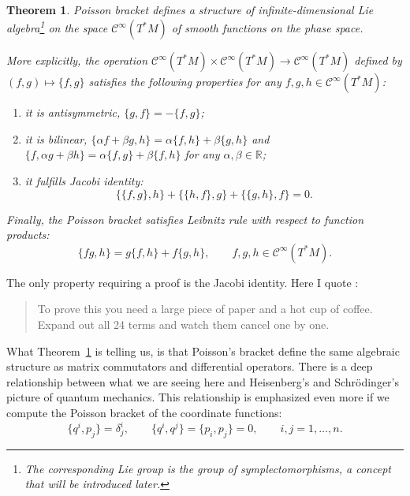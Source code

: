 \documentclass[english,fontsize=11pt,paper=b5]{scrbook}
\numberwithin{equation}{chapter}
\newtheorem{theorem}{Theorem}[chapter]
\theoremstyle{definition}
\begin{document}
    \begin{theorem}\label{thm:PoissonLieAlgebra}
      Poisson bracket defines a structure of infinite-dimensional Lie algebra\footnote{The corresponding Lie group is the group of symplectomorphisms, a concept that will be introduced later.} on the space $\mathcal{C}^\infty(T^*M)$ of smooth functions on the phase space.

      More explicitly, the operation $\mathcal{C}^\infty(T^*M)\times \mathcal{C}^\infty(T^*M) \to \mathcal{C}^\infty(T^*M)$ defined by $(f,g) \mapsto \big\{f,g\big\}$ satisfies the following properties for any $f,g,h \in \mathcal{C}^\infty(T^*M)$:
      \begin{enumerate}
        \item it is antisymmetric, $\big\{g,f\big\} = - \big\{f,g\big\}$;
        \item it is bilinear, $\big\{\alpha f + \beta g, h\big\} = \alpha\big\{f,h\big\} + \beta\big\{g,h\big\}$ and $\big\{f, \alpha g + \beta h\big\} = \alpha\big\{f,g\big\} + \beta\big\{f,h\big\}$ for any $\alpha, \beta \in\mathbb{R}$;
        \item it fulfills \emph{Jacobi identity}:
          \begin{equation}\label{eq:JacobiId}
            \big\{\big\{f,g\big\},h\big\} + \big\{\big\{h,f\big\},g\big\} + \big\{\big\{g,h\big\},f\big\} = 0.
          \end{equation}
      \end{enumerate}
      Finally, the Poisson bracket satisfies \emph{Leibnitz rule} with respect to function products:
      \begin{equation}\label{eq:LeibnitzId}
        \big\{fg, h\big\} = g\big\{f, h\big\} + f \big\{g, h\big\}, \qquad f,g,h \in \mathcal{C}^\infty(T^*M).
      \end{equation}
    \end{theorem}

    The only property requiring a proof is the Jacobi identity.
    Here I quote \cite{lectures:tong}:
    \begin{quote}
      To prove this you need a large piece of paper and a hot cup of coffee. Expand out all 24 terms and watch them cancel one by one.
    \end{quote}

    What Theorem~\ref{thm:PoissonLieAlgebra} is telling us, is that Poisson's bracket define the same algebraic structure as matrix commutators and differential operators.
    There is a deep relationship between what we are seeing here and Heisenberg's and Schr\"odinger's picture of quantum mechanics.
    This relationship is emphasized even more if we compute the Poisson bracket of the coordinate functions:
    \begin{equation}\label{eq:coordcommutators}
      \big\{q^i,p_j\big\} = \delta^i_j, \qquad \big\{q^i,q^j\big\} = \big\{p_i,p_j\big\} = 0, \qquad i,j = 1,\ldots,n.
    \end{equation}
\end{document}
